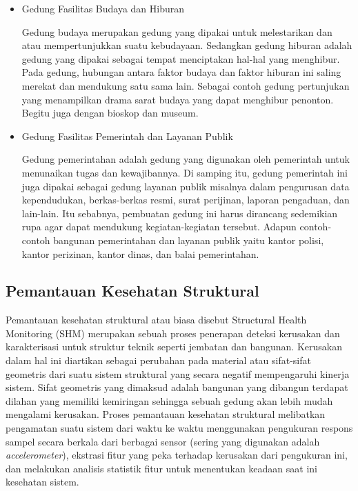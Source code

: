 \begin{itemize}
\begin{itemize}
		\item Gedung Fasilitas Budaya dan Hiburan
		
		Gedung budaya merupakan gedung yang dipakai untuk melestarikan dan atau mempertunjukkan suatu kebudayaan. Sedangkan gedung hiburan adalah gedung yang dipakai sebagai tempat menciptakan hal-hal yang menghibur. Pada gedung, hubungan antara faktor budaya dan faktor hiburan ini saling merekat dan mendukung satu sama lain. Sebagai contoh gedung pertunjukan yang menampilkan drama sarat budaya yang dapat menghibur penonton. Begitu juga dengan bioskop dan museum.
		
		\item Gedung Fasilitas Pemerintah dan Layanan Publik
		
		Gedung pemerintahan adalah gedung yang digunakan oleh pemerintah untuk menunaikan tugas dan kewajibannya. Di samping itu, gedung pemerintah ini juga dipakai sebagai gedung layanan publik misalnya dalam pengurusan data kependudukan, berkas-berkas resmi, surat perijinan, laporan pengaduan, dan lain-lain. Itu sebabnya, pembuatan gedung ini harus dirancang sedemikian rupa agar dapat mendukung kegiatan-kegiatan tersebut. Adapun contoh-contoh bangunan pemerintahan dan layanan publik yaitu kantor polisi, kantor perizinan, kantor dinas, dan balai pemerintahan.
	\end{itemize}
\end{itemize}

\subsection{Pemantauan Kesehatan Struktural \cite{struktural}}

Pemantauan kesehatan struktural atau biasa disebut Structural Health Monitoring (SHM) merupakan sebuah proses penerapan deteksi kerusakan dan karakterisasi untuk struktur teknik seperti jembatan dan bangunan. Kerusakan dalam hal ini diartikan sebagai perubahan pada material atau sifat-sifat geometris dari suatu sistem struktural yang secara negatif mempengaruhi kinerja sistem. Sifat geometris yang dimaksud adalah bangunan yang dibangun terdapat dilahan yang memiliki kemiringan sehingga sebuah gedung akan lebih mudah mengalami kerusakan. Proses pemantauan kesehatan struktural melibatkan pengamatan suatu sistem dari waktu ke waktu menggunakan pengukuran respons sampel secara berkala dari berbagai sensor (sering yang digunakan adalah \textit{accelerometer}), ekstrasi fitur yang peka terhadap kerusakan dari pengukuran ini, dan melakukan analisis statistik fitur untuk menentukan keadaan saat ini kesehatan sistem.

